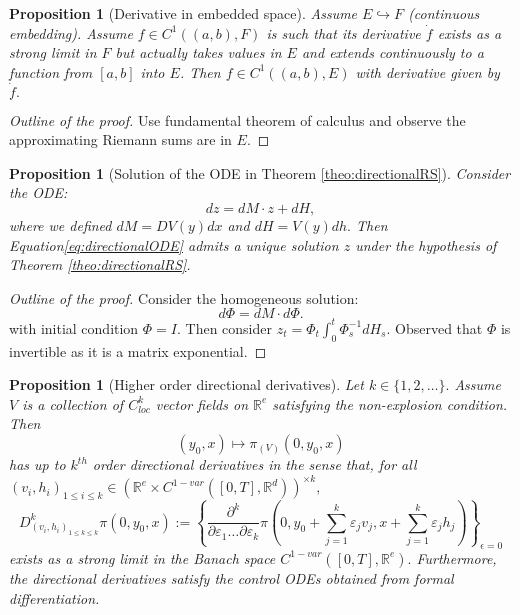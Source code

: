 \documentclass{article}
\newcommand{\R}{\mathbb{R}}
\newtheorem{prop}[theorem]{Proposition}
\begin{document}
\begin{prop}[Derivative in embedded space]
    Assume $E \hookrightarrow F$ (continuous embedding). Assume $f \in C^1((a,b), F)$ is such that its derivative $\dot{f}$ exists as a strong limit in $F$ but actually takes values in $E$ and extends continuously to a function from $[a,b]$ into $E$. Then $f \in C^1((a,b), E)$ with derivative given by $\dot{f}.$
\end{prop}
\begin{proof}[Outline of the proof]
    Use fundamental theorem of calculus and observe the approximating Riemann sums are in $E$.
\end{proof}

\begin{prop}[Solution of the ODE in Theorem \ref{theo:directionalRS}]
    Consider the ODE:
    \begin{equation}\label{eq:directionalODE}
        dz = dM \cdot z + dH, 
    \end{equation}
    where we defined $dM = DV(y) dx$ and $dH = V(y) dh.$
    Then Equation\ref{eq:directionalODE} admits a unique solution $z$ under the hypothesis of Theorem \ref{theo:directionalRS}.
\end{prop}
\begin{proof}[Outline of the proof]
    Consider the homogeneous solution:
    \begin{equation}
        d \Phi = dM \cdot d \Phi.
    \end{equation}
    with initial condition $\Phi = I.$
    Then consider $z_t = \Phi_t \int_0^t \Phi_s^{-1} dH_s.$
    Observed that $\Phi$ is invertible as it is a matrix exponential.
\end{proof}

\begin{prop}[Higher order directional derivatives]
    Let $k \in \{ 1, 2, \ldots \}.$
    Assume $V$ is a collection of $C^k_{loc}$ vector fields on $\R^e$ satisfying the non-explosion condition. Then
    \begin{equation*}
        (y_0, x) \mapsto \pi_{(V)}(0, y_0, x)
    \end{equation*}
    has up to $k^{th}$ order directional derivatives in the sense that, for all $(v_i, h_i)_{1 \leq i \leq k} \in (\R^e \times C^{1-var}([0,T], \R^d))^{\times k},$
    \begin{equation}
        D_{(v_i, h_i)_{1 \leq k \leq k}}^k \pi(0, y_0, x) := \left\{ \frac{\partial^k}{\partial \varepsilon_1 \ldots \partial \varepsilon_k} \pi \left( 0, y_0 + \sum_{j=1}^k \varepsilon_j v_j, x + \sum_{j=1}^k \varepsilon_j h_j \right) \right\}_{\epsilon = 0}
    \end{equation}
    exists as a strong limit in the Banach space $C^{1-var}([0,T], \R^e).$
    Furthermore, the directional derivatives satisfy the control ODEs obtained from formal differentiation.
\end{prop}
\end{document}

